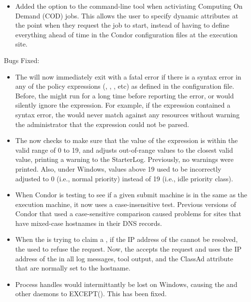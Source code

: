 \begin{itemize}

\item Added the  option to the  command-line
  tool when activiating Computing On Demand (COD) jobs.
  This allows the user to specify dynamic attributes at the point when
  they request the job to start, instead of having to define
  everything ahead of time in the Condor configuration files at the
  execution site.

\end{itemize}

\noindent Bugs Fixed:

\begin{itemize}

\item The  will now immediately exit with a fatal error
  if there is a syntax error in any of the policy expressions
  (, , , etc) as
  defined in the configuration file.
  Before, the  might run for a long time before
  reporting the error, or would silently ignore the expression.
  For example, if the  expression contained a syntax
  error, the  would never match against any resources
  without warning the administrator that the 
  expression could not be parsed.

\item The  now checks to make sure that the value of
      the  expression is within the
      valid range of 0 to 19, and adjusts out-of-range values to the
      closest valid value, printing a warning to the StarterLog.
      Previously, no warnings were printed.  Also, under Windows,
      values above 19 used to be incorrectly adjusted to 0 (i.e.,
      normal priority) instead of 19 (i.e., idle priority class).

\item When Condor is testing to see if a given submit machine is in
  the same  as the execution machine, it now uses 
  a case-insensitive test.
  Previous versions of Condor that used a case-sensitive comparison
  caused problems for sites that have mixed-case hostnames in their
  DNS records.

\item When the  is trying to claim a ,
  if the IP address of the  cannot be resolved, the
   used to refuse the request.
  Now, the  accepts the request and uses the IP address
  of the  in all log messages, tool output, and the
   ClassAd attribute that are normally set to the
  hostname.

\item Process handles would intermittantly be lost on Windows, causing
  the  and other daemons to EXCEPT(). This has been fixed.

\end{itemize}

